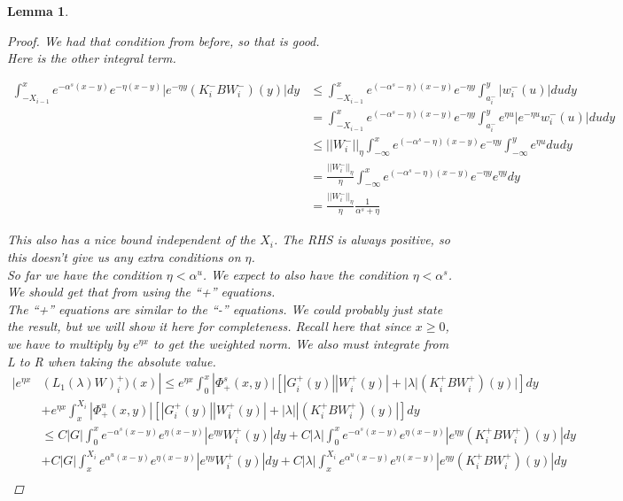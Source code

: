 \documentclass[12pt]{article}
\newtheorem{lemma}{Lemma}
\begin{document}
\begin{lemma}
\begin{proof}
We had that condition from before, so that is good.\\

Here is the other integral term. 

\begin{align*}
\int_{-X_{i-1}}^x e^{-\alpha^s (x-y)}e^{-\eta(x-y)}|e^{-\eta y} (K_i^- B W_i^-)(y)| dy &\leq \int_{-X_{i-1}}^x e^{(-\alpha^s - \eta)(x-y)}e^{-\eta y} \int_{a_i^-}^y |w_i^-(u)| du dy \\
&= \int_{-X_{i-1}}^x e^{(-\alpha^s - \eta)(x-y)}e^{-\eta y} \int_{a_i^-}^y e^{\eta u} |e^{-\eta u} w_i^-(u)| du dy \\
&\leq ||W_i^-||_\eta \int_{-\infty}^x e^{(-\alpha^s - \eta)(x-y)}e^{-\eta y} \int_{-\infty}^y e^{\eta u} du dy \\
&= \frac{||W_i^-||_\eta}{\eta} \int_{-\infty}^x e^{(-\alpha^s - \eta)(x-y)}e^{-\eta y} e^{\eta y} dy \\
&= \frac{||W_i^-||_\eta}{\eta} \frac{1}{\alpha^s + \eta}
\end{align*}

This also has a nice bound independent of the $X_i$. The RHS is always positive, so this doesn't give us any extra conditions on $\eta$.\\

So far we have the condition $\eta < \alpha^u$. We expect to also have the condition $\eta < \alpha^s$. We should get that from using the ``+'' equations.\\

The ``+'' equations are similar to the ``-'' equations. We could probably just state the result, but we will show it here for completeness. Recall here that since $x \geq 0$, we have to multiply by $e^{\eta x}$ to get the weighted norm. We also must integrate from L to R when taking the absolute value.\\

\begin{align*}
|e^{\eta x} & (L_1(\lambda)W)_i^+)(x) | \leq e^{\eta x} \int_0^x |\Phi^s_+(x, y)|[|G_i^+(y)||W_i^+(y)| + |\lambda|(K_i^+ B W_i^+)(y)| ] dy \\
&+ e^{\eta x} \int_x^{X_i} |\Phi^u_+(x, y)|[|G_i^+(y)||W_i^+(y)| + |\lambda||(K_i^+ B W_i^+)(y)| ] dy \\
&\leq C|G| \int_0^x e^{-\alpha^s (x-y)}e^{\eta(x-y)}|e^{\eta y} W_i^+(y)| dy 
+ C|\lambda|\int_0^x e^{-\alpha^s (x-y)}e^{\eta(x-y)}|e^{\eta y} (K_i^+ B W_i^+)(y)| dy \\
&+ C|G| \int_x^{X_i} e^{\alpha^u (x-y)}e^{\eta(x-y)}|e^{\eta y} W_i^+(y)| dy 
+ C|\lambda|\int_x^{X_i} e^{\alpha^u (x-y)}e^{\eta(x-y)}|e^{\eta y} (K_i^+ B W_i^+)(y)| dy \\ 
\end{align*}


\end{proof}
\end{lemma}
\end{document}
